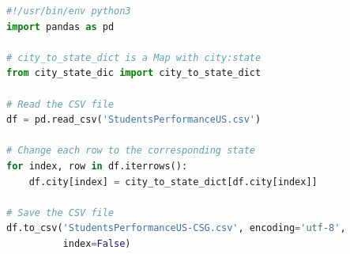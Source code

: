 \documentclass[a4paper, 11pt]{article}
\begin{document}
\begin{lstlisting}[language=Python, caption={Python script used to replace each 
city with the corresponding State}, label={lst:city-state}]
#!/usr/bin/env python3
import pandas as pd

# city_to_state_dict is a Map with city:state
from city_state_dic import city_to_state_dict

# Read the CSV file
df = pd.read_csv('StudentsPerformanceUS.csv')

# Change each row to the corresponding state
for index, row in df.iterrows():
    df.city[index] = city_to_state_dict[df.city[index]]

# Save the CSV file
df.to_csv('StudentsPerformanceUS-CSG.csv', encoding='utf-8',
          index=False)    
\end{lstlisting}
\end{document}
